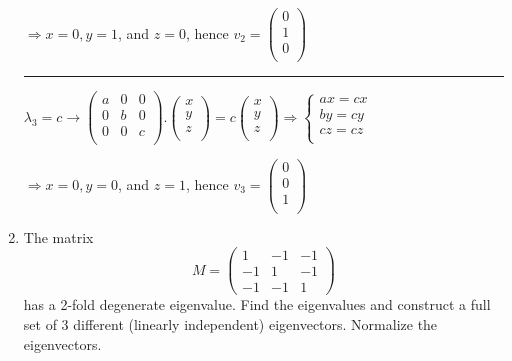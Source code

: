 \documentclass[fleqn]{article}
\begin{document}
\begin{enumerate}
      \textcolor{hwColor}{
        $
        \Longrightarrow 
        x=0, y=1$, and $z=0$, hence $v_2=\begin{pmatrix}
          0 \\
          1 \\
          0 \\
        \end{pmatrix}
        $
      }

      
      \textcolor{hwColor}{
        \rule{16cm}{0.4pt}
      }

      \textcolor{hwColor}{
        $
        \lambda_3=c \rightarrow 
        \begin{pmatrix}
          a & 0 & 0 \\
          0 & b & 0 \\
          0 & 0 & c \\
        \end{pmatrix}.\begin{pmatrix}
          x \\
          y \\
          z \\
        \end{pmatrix}=c\begin{pmatrix}
          x \\
          y \\
          z \\
        \end{pmatrix} 
        \Longrightarrow 
        \begin{cases}
          ax=cx \\
          by=cy \\
          cz=cz \\
        \end{cases}
        $
      }

      \textcolor{hwColor}{
        $
        \Longrightarrow 
        x=0, y=0$, and $z=1$, hence $v_3=\begin{pmatrix}
          0 \\
          0 \\
          1 \\
        \end{pmatrix}
        $
      }


  
    \item The matrix 
      $$M = 
      \begin{pmatrix}
      1 & -1 & -1 \\
      -1 & 1 & -1 \\
      -1 & -1 & 1
      \end{pmatrix}
      $$
      has a 2-fold degenerate eigenvalue. Find the eigenvalues and construct a full set of 3 different
      (linearly independent) eigenvectors. Normalize the eigenvectors.


\end{enumerate}
\end{document}
